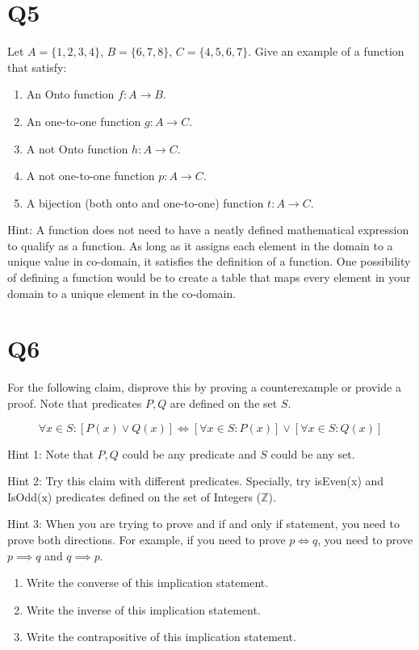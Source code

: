 \documentclass[12pt]{exam}
\begin{document}
\section{Q5}
Let $A = \{1, 2, 3, 4\}$, $B= \{ 6,7,8\}$, $C=\{4,5,6,7\}$.
Give an example of a function that satisfy:
\begin{enumerate}
    \item An Onto function $f: A \rightarrow B$.
    \item An one-to-one function $g: A \rightarrow C$.
    \item A not Onto function $h: A \rightarrow C$.
    \item A not one-to-one function $p: A \rightarrow C$.
    \item A bijection (both onto and one-to-one) function $t: A \rightarrow C$. 
\end{enumerate}

Hint: A function does not need to have a neatly defined mathematical expression to qualify as a function. As long as it assigns each element in the domain to a unique value in co-domain, it satisfies the definition of a function. One possibility of defining a function would be to create a table that maps every element in your domain to a unique element in the co-domain.


\section{Q6}
For the following claim, disprove this by proving a counterexample or provide a proof. Note that predicates $P,Q$ are defined on the set $S$. 

\[\forall x \in S : [ P(x) \vee Q(x) ] \iff [\forall x \in S : P(x)] \vee [\forall x \in S : Q(x)]\]

Hint 1: Note that $P, Q$ could be any predicate and $S$ could be any set. 

Hint 2: Try this claim with different predicates. Specially, try isEven(x) and IsOdd(x) predicates defined on the set of Integers ($\mathds{Z}$).

Hint 3: When you are trying to prove and if and only if statement, you need to prove both directions. For example, if you need to prove $p \iff q$, you need to prove $p \implies q$ and $q \implies p$. 

\begin{enumerate}
    \item Write the converse of this implication statement.
    \item Write the inverse of this implication statement.
    \item Write the contrapositive of this implication statement.
\end{enumerate}
\end{document}
